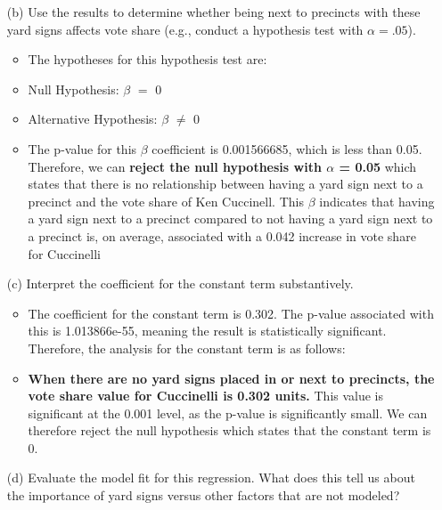 \documentclass[12pt,letterpaper]{article}
\begin{document}
\begin{enumerate}
\begin{itemize}
	
\end{itemize}

			
	\item [(b)]  Use the results to determine whether being
	next to precincts with these yard signs affects vote
	share (e.g., conduct a hypothesis test with $\alpha = .05$).
	
	
\begin{itemize}
	\item The hypotheses for this hypothesis test are:
	\item {Null Hypothesis: $\beta$ $=$ 0}
	\item {Alternative Hypothesis: $\beta$ $\neq$ 0}
	\item The p-value for this $\beta$ coefficient is 0.001566685, which is less than 0.05. Therefore, we can \textbf{reject the null hypothesis with $\alpha$ = 0.05} which states that there is no relationship between having a yard sign next to a precinct and the vote share of Ken Cuccinell. This $\beta$ indicates that having a yard sign next to a precinct compared to not having a yard sign next to a precinct is, on average, associated with a 0.042 increase in vote share for Cuccinelli
	
\end{itemize}


	\item [(c)] Interpret the coefficient for the constant term substantively.
	
\begin{itemize}
	\item The coefficient for the constant term is 0.302. The  p-value associated with this is 1.013866e-55, meaning the result is statistically significant. Therefore, the analysis for the constant term is as follows:
	\item \textbf{When there are no yard signs placed in or next to precincts, the vote share value for Cuccinelli is 0.302 units.} This value is significant at the 0.001 level, as the p-value is significantly small. We can therefore reject the null hypothesis which states that the constant term is 0.
\end{itemize}
	\vspace{2cm}
	
	\item [(d)] Evaluate the model fit for this regression.  What does this	tell us about the importance of yard signs versus other factors that are not modeled?
	

\end{enumerate}
\end{document}
